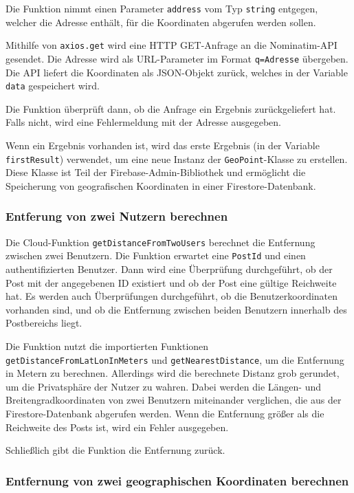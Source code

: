 Die Funktion nimmt einen Parameter \texttt{address} vom Typ \texttt{string} entgegen, welcher die Adresse enthält, für die Koordinaten abgerufen werden sollen.

Mithilfe von \texttt{axios.get} wird eine HTTP GET-Anfrage an die Nominatim-API gesendet. Die Adresse wird als URL-Parameter im Format \texttt{q=Adresse} übergeben. Die API liefert die Koordinaten als JSON-Objekt zurück, welches in der Variable \texttt{data} gespeichert wird.

Die Funktion überprüft dann, ob die Anfrage ein Ergebnis zurückgeliefert hat. Falls nicht, wird eine Fehlermeldung mit der Adresse ausgegeben.

Wenn ein Ergebnis vorhanden ist, wird das erste Ergebnis (in der Variable \texttt{firstResult}) verwendet, um eine neue Instanz der \texttt{GeoPoint}-Klasse zu erstellen. Diese Klasse ist Teil der Firebase-Admin-Bibliothek und ermöglicht die Speicherung von geografischen Koordinaten in einer Firestore-Datenbank.

\subsubsection{Entferung von zwei Nutzern berechnen}
Die Cloud-Funktion \texttt{getDistanceFromTwoUsers} berechnet die Entfernung zwischen zwei Benutzern. Die Funktion erwartet eine \texttt{PostId} und einen authentifizierten Benutzer. Dann wird eine Überprüfung durchgeführt, ob der Post mit der angegebenen ID existiert und ob der Post eine gültige Reichweite hat. Es werden auch Überprüfungen durchgeführt, ob die Benutzerkoordinaten vorhanden sind, und ob die Entfernung zwischen beiden Benutzern innerhalb des Postbereichs liegt.

Die Funktion nutzt die importierten Funktionen \texttt{getDistanceFromLatLonInMeters} und \texttt{getNearestDistance}, um die Entfernung in Metern zu berechnen. Allerdings wird die berechnete Distanz grob gerundet, um die Privatsphäre der Nutzer zu wahren. Dabei werden die Längen- und Breitengradkoordinaten von zwei Benutzern miteinander verglichen, die aus der Firestore-Datenbank abgerufen werden. Wenn die Entfernung größer als die Reichweite des Posts ist, wird ein Fehler ausgegeben.

Schließlich gibt die Funktion die Entfernung zurück.

\subsubsection{Entfernung von zwei geographischen Koordinaten berechnen}

